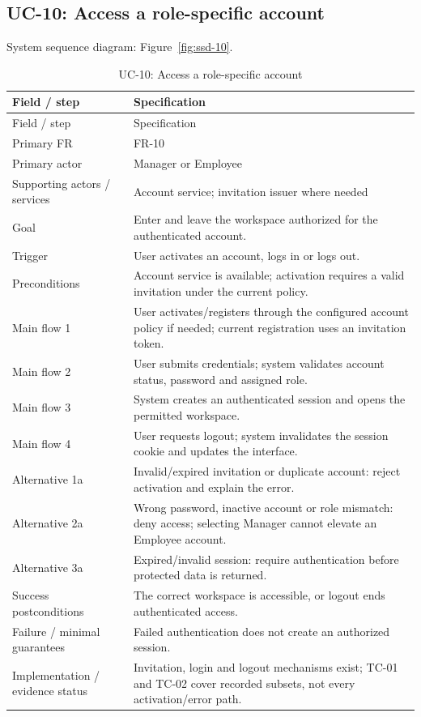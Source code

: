 \subsection*{UC-10: Access a role-specific account}
\label{uc:10}
System sequence diagram: Figure~\ref{fig:ssd-10}.

\begin{longtable}{P{0.23\textwidth}P{0.67\textwidth}}
\caption{UC-10: Access a role-specific account}\\
\toprule
Field / step & Specification\\
\midrule
\endfirsthead
\toprule
Field / step & Specification\\
\midrule
\endhead
Primary FR & FR-10\\
Primary actor & Manager or Employee\\
Supporting actors / services & Account service; invitation issuer where needed\\
Goal & Enter and leave the workspace authorized for the authenticated account.\\
Trigger & User activates an account, logs in or logs out.\\
Preconditions & Account service is available; activation requires a valid invitation under the current policy.\\
Main flow 1 & User activates/registers through the configured account policy if needed; current registration uses an invitation token.\\
Main flow 2 & User submits credentials; system validates account status, password and assigned role.\\
Main flow 3 & System creates an authenticated session and opens the permitted workspace.\\
Main flow 4 & User requests logout; system invalidates the session cookie and updates the interface.\\
Alternative 1a & Invalid/expired invitation or duplicate account: reject activation and explain the error.\\
Alternative 2a & Wrong password, inactive account or role mismatch: deny access; selecting Manager cannot elevate an Employee account.\\
Alternative 3a & Expired/invalid session: require authentication before protected data is returned.\\
Success postconditions & The correct workspace is accessible, or logout ends authenticated access.\\
Failure / minimal guarantees & Failed authentication does not create an authorized session.\\
Implementation / evidence status & Invitation, login and logout mechanisms exist; TC-01 and TC-02 cover recorded subsets, not every activation/error path.\\
\bottomrule
\end{longtable}

